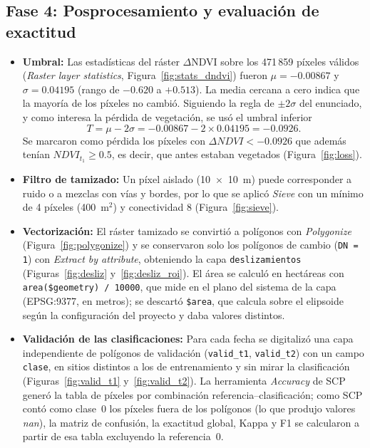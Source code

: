\documentclass[12pt]{article}
\begin{document}
\subsection{Fase 4: Posprocesamiento y evaluación de exactitud}
\begin{itemize}
    \item \textbf{Umbral:} Las estadísticas del ráster $\Delta$NDVI sobre los 471\,859 píxeles válidos (\emph{Raster layer statistics}, Figura~\ref{fig:stats_dndvi}) fueron $\mu = -0.00867$ y $\sigma = 0.04195$ (rango de $-0.620$ a $+0.513$). La media cercana a cero indica que la mayoría de los píxeles no cambió. Siguiendo la regla de $\pm 2\sigma$ del enunciado, y como interesa la pérdida de vegetación, se usó el umbral inferior
    \[
    T = \mu - 2\sigma = -0.00867 - 2 \times 0.04195 = -0.0926 .
    \]
    Se marcaron como pérdida los píxeles con $\Delta NDVI < -0.0926$ que además tenían $NDVI_{t_1} \geq 0.5$, es decir, que antes estaban vegetados (Figura~\ref{fig:loss}).
    \item \textbf{Filtro de tamizado:} Un píxel aislado (10~$\times$~10~m) puede corresponder a ruido o a mezclas con vías y bordes, por lo que se aplicó \emph{Sieve} con un mínimo de 4 píxeles (400~m$^2$) y conectividad 8 (Figura~\ref{fig:sieve}).
    \item \textbf{Vectorización:} El ráster tamizado se convirtió a polígonos con \emph{Polygonize} (Figura~\ref{fig:polygonize}) y se conservaron solo los polígonos de cambio (\texttt{DN = 1}) con \emph{Extract by attribute}, obteniendo la capa \texttt{deslizamientos} (Figuras~\ref{fig:desliz} y~\ref{fig:desliz_roi}). El área se calculó en hectáreas con \texttt{area(\$geometry) / 10000}, que mide en el plano del sistema de la capa (EPSG:9377, en metros); se descartó \texttt{\$area}, que calcula sobre el elipsoide según la configuración del proyecto y daba valores distintos.
    \item \textbf{Validación de las clasificaciones:} Para cada fecha se digitalizó una capa independiente de polígonos de validación (\texttt{valid\_t1}, \texttt{valid\_t2}) con un campo \texttt{clase}, en sitios distintos a los de entrenamiento y sin mirar la clasificación (Figuras~\ref{fig:valid_t1} y~\ref{fig:valid_t2}). La herramienta \emph{Accuracy} de SCP generó la tabla de píxeles por combinación referencia--clasificación; como SCP contó como clase~0 los píxeles fuera de los polígonos (lo que produjo valores \emph{nan}), la matriz de confusión, la exactitud global, Kappa y F1 se calcularon a partir de esa tabla excluyendo la referencia~0.

\end{itemize}
\end{document}
